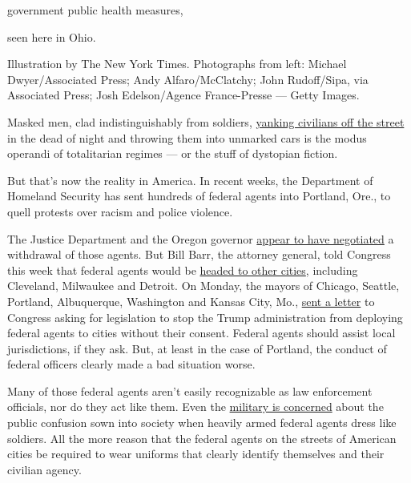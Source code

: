 government public health measures,

seen here in Ohio.

Illustration by The New York Times. Photographs from left: Michael
Dwyer/Associated Press; Andy Alfaro/McClatchy; John Rudoff/Sipa, via
Associated Press; Josh Edelson/Agence France-Presse --- Getty Images.

Masked men, clad indistinguishably from soldiers,
\href{https://www.nytimes3xbfgragh.onion/2020/07/17/us/politics/federal-agents-portland-arrests.html}{yanking
civilians off the street} in the dead of night and throwing them into
unmarked cars is the modus operandi of totalitarian regimes --- or the
stuff of dystopian fiction.

But that's now the reality in America. In recent weeks, the Department
of Homeland Security has sent hundreds of federal agents into Portland,
Ore., to quell protests over racism and police violence.

The Justice Department and the Oregon governor
\href{https://www.nytimes3xbfgragh.onion/2020/07/29/us/protests-portland-federal-withdrawal.html?action=click\&module=Top\%20Stories\&pgtype=Homepage}{appear
to have negotiated} a withdrawal of those agents. But Bill Barr, the
attorney general, told Congress this week that federal agents would be
\href{https://www.nytimes3xbfgragh.onion/reuters/2020/07/29/us/politics/29reuters-global-race-protests.html}{headed
to other cities}, including Cleveland, Milwaukee and Detroit. On Monday,
the mayors of Chicago, Seattle, Portland, Albuquerque, Washington and
Kansas City, Mo.,
\href{https://www.npr.org/sections/live-updates-protests-for-racial-justice/2020/07/27/895904023/mayors-demand-congress-block-trump-from-deploying-federal-agents-to-cities}{sent
a letter} to Congress asking for legislation to stop the Trump
administration from deploying federal agents to cities without their
consent. Federal agents should assist local jurisdictions, if they ask.
But, at least in the case of Portland, the conduct of federal officers
clearly made a bad situation worse.

Many of those federal agents aren't easily recognizable as law
enforcement officials, nor do they act like them. Even the
\href{https://www.washingtonpost.com/national-security/2020/07/22/cbp-military-camouflage-uniforms/}{military
is concerned} about the public confusion sown into society when heavily
armed federal agents dress like soldiers. All the more reason that the
federal agents on the streets of American cities be required to wear
uniforms that clearly identify themselves and their civilian agency.

